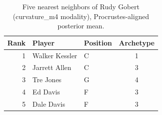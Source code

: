 \begin{table}[htbp]
  \centering\small
  \begin{tabular}{rllc}
    \toprule
    Rank & Player & Position & Archetype \\
    \midrule
    1 & Walker Kessler & C & 1 \\
    2 & Jarrett Allen & C & 3 \\
    3 & Tre Jones & G & 4 \\
    4 & Ed Davis & F & 3 \\
    5 & Dale Davis & F & 3 \\
    \bottomrule
  \end{tabular}
  \caption{Five nearest neighbors of Rudy Gobert (curvature_m4 modality), Procrustes-aligned posterior mean.}
  \label{tab:Rudy_Gobert_neighbors_curvature_m4}
\end{table}

